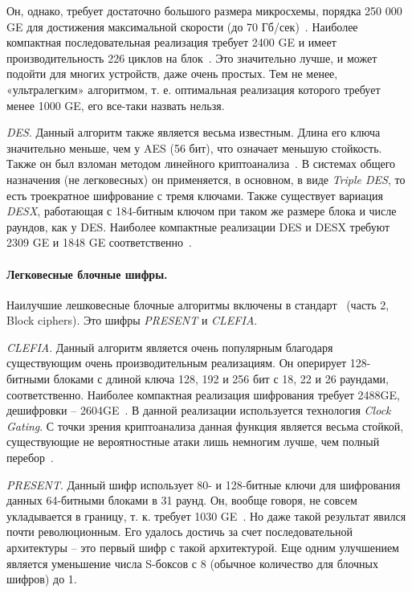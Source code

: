 Он, однако, требует достаточно большого размера микросхемы, порядка 250 000 GE  для достижения максимальной скорости (до 70 Гб/сек)~\cite{src33}. Наиболее компактная последовательная реализация требует 2400 GE  и имеет производительность 226 циклов на блок~\cite{src34}. Это значительно лучше, и может подойти для многих устройств, даже очень простых. Тем не менее, «ультралегким» алгоритмом, т. е. оптимальная реализация которого требует менее 1000 GE, его все-таки назвать нельзя.

\textit{DES}. Данный алгоритм также является весьма известным. Длина его ключа значительно меньше, чем у AES (56 бит), что означает меньшую стойкость. Также он был взломан методом линейного криптоанализа~\cite{src35}. В системах общего назначения (не легковесных) он применяется, в основном, в виде\textit{ Triple DES}, то есть троекратное шифрование с тремя ключами. Также существует вариация \textit{DESX}, работающая с 184-битным ключом при таком же размере блока и числе раундов, как у DES. Наиболее компактные реализации DES и DESX требуют 2309 GE и 1848 GE соответственно~\cite{src36}.

\paragraph{Легковесные блочные шифры.} Наилучшие лешковесные блочные алгоритмы включены в стандарт~\cite{src26} (часть 2, Block ciphers). Это шифры \textit{PRESENT} и \textit{CLEFIA}.

\textit{CLEFIA}. Данный алгоритм является очень популярным благодаря существующим очень производительным реализациям. Он оперирует 128-битными блоками с длиной ключа 128, 192 и 256 бит с 18, 22 и 26 раундами, соответственно. Наиболее компактная реализация шифрования требует 2488GE, дешифровки – 2604GE~\cite{src37}. В данной реализации используется технология \textit{Clock Gating}. С точки зрения криптоанализа данная функция является весьма стойкой, существующие не вероятностные атаки лишь немногим лучше, чем полный перебор~\cite{src38}.

\textit{PRESENT}. Данный шифр использует 80- и 128-битные ключи для шифрования данных 64-битными блоками в 31 раунд. Он, вообще говоря, не совсем укладывается в границу, т. к. требует 1030 GE~\cite{src39}. Но даже такой результат явился почти революционным. Его удалось достичь за счет последовательной архитектуры – это первый шифр с такой архитектурой. Еще одним улучшением является уменьшение числа S-боксов с 8 (обычное количество для блочных шифров) до 1.

